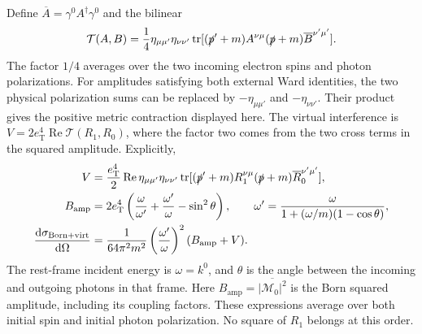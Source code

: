 Define $\overline A=\gamma^0A^\dagger\gamma^0$ and the bilinear
\begin{equation}
 \mathcal T(A,B)=\frac14\eta_{\mu\mu'}\eta_{\nu\nu'}
 \operatorname{tr}[(\slashed p'+m)A^{\nu\mu}
 (\slashed p+m)\overline B^{\nu'\mu'}].
 \label{eq:comp-supp-trace-bilinear}
\end{equation}
The factor $1/4$ averages over the two incoming electron spins and
photon polarizations. For amplitudes satisfying both external Ward
identities, the two physical polarization sums can be replaced by
$-\eta_{\mu\mu'}$ and $-\eta_{\nu\nu'}$. Their product gives the
positive metric contraction displayed here. The virtual interference
is $V=2e_{\mathrm T}^4\operatorname{Re}\mathcal T(R_1,R_0)$,
where the factor two comes from the two cross terms in the squared
amplitude. Explicitly,
\begin{align}
 V&=\frac{e_{\mathrm T}^4}{2}\operatorname{Re}
 \eta_{\mu\mu'}\eta_{\nu\nu'}\operatorname{tr}
 [(\slashed p'+m)R_1^{\nu\mu}(\slashed p+m)
                         \overline R_0^{\nu'\mu'}],\\
 B_{\mathrm{amp}}&=2e_{\mathrm T}^4
 \left(\frac{\omega}{\omega'}+\frac{\omega'}{\omega}-\sin^2\theta\right),
 \qquad \omega'=\frac{\omega}{1+(\omega/m)(1-\cos\theta)},\\
 \frac{\dd\sigma_{\mathrm{Born+virt}}}{\dd\Omega}
 &=\frac1{64\pi^2m^2}\left(\frac{\omega'}{\omega}\right)^2(B_{\mathrm{amp}}+V).
\end{align}
The rest-frame incident energy is $\omega=k^0$, and $\theta$
is the angle between the incoming and outgoing photons in that frame.
Here $B_{\mathrm{amp}}=\overline{|\mathcal M_0|^2}$ is the Born squared amplitude,
including its coupling factors.
These expressions average over both initial spin and initial photon
polarization. No square of $R_1$ belongs at this order.

